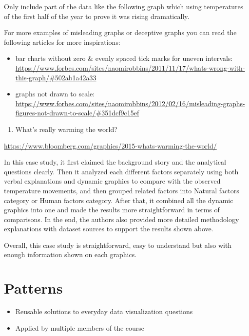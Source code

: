 \documentclass[]{book}
\providecommand{\tightlist}{%
  \setlength{\itemsep}{0pt}\setlength{\parskip}{0pt}}
\theoremstyle{definition}
\theoremstyle{definition}
\theoremstyle{definition}
\theoremstyle{remark}
\begin{document}
Only include part of the data like the following graph which using
temperatures of the first half of the year to prove it was rising
dramatically.

For more examples of misleading graphs or deceptive graphs you can read
the following articles for more inspirations:

\begin{itemize}
\tightlist
\item
  bar charts without zero \& evenly spaced tick marks for uneven
  intervals:
  \url{https://www.forbes.com/sites/naomirobbins/2011/11/17/whats-wrong-with-this-graph/\#502ab1a42a33}
\item
  graphs not drawn to scale:
  \url{https://www.forbes.com/sites/naomirobbins/2012/02/16/misleading-graphs-figures-not-drawn-to-scale/\#351dcf9c15ef}
\end{itemize}

\begin{enumerate}
\def\labelenumi{\arabic{enumi}.}
\setcounter{enumi}{5}
\tightlist
\item
  What's really warming the world?
\end{enumerate}

\url{https://www.bloomberg.com/graphics/2015-whats-warming-the-world/}

In this case study, it first claimed the background story and the
analytical questions clearly. Then it analyzed each different factors
separately using both verbal explanations and dynamic graphics to
compare with the observed temperature movements, and then grouped
related factors into Natural factors category or Human factors category.
After that, it combined all the dynamic graphics into one and made the
results more straightforward in terms of comparisons. In the end, the
authors also provided more detailed methodology explanations with
dataset sources to support the results shown above.

Overall, this case study is straightforward, easy to understand but also
with enough information shown on each graphics.

\chapter{Patterns}\label{patterns}

\begin{itemize}
\tightlist
\item
  Reusable solutions to everyday data visualization questions
\item
  Applied by multiple members of the course
\end{itemize}
\end{document}

